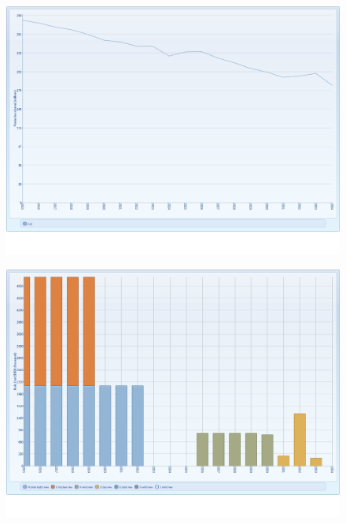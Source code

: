 \documentclass{article}
\begin{document}
\begin{figure}[htbp]
\begin{center}
\includegraphics[width=13cm,keepaspectratio=true]{figures/Expansion/GreenCertificate/Co2ProductionGC}
\caption{}
\label{fig:Co2ProductionGC}
\end{center}
\end{figure}
\begin{figure}[htbp]
\begin{center}
\includegraphics[width=13cm,keepaspectratio=true]{figures/Expansion/EmissionTax/BuildCostET}
\caption{}
\label{fig:BuildCostET}
\end{center}
\end{figure}
\end{document}
